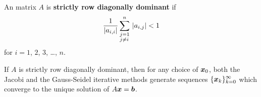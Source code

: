 \begin{defn}
An \nn matrix $A$ is
{\bfseries strictly row diagonally dominant} if
\[
\frac{1}{|a_{i,i}|}
\sum_{\begin{subarray}{l} j=1 \\j \neq i \end{subarray}}^n \,
|a_{i,j}| < 1
\]
for $i=1$, $2$, $3$, \ldots , $n$.
\end{defn}

\begin{theorem}
If $A$ is strictly row diagonally dominant, then for any choice of
$\bm{x}_{0}$, both the Jacobi and the Gauss-Seidel iterative methods
generate sequences $\displaystyle \{\bm{x}_k\}_{k=0}^\infty$ which
converge to the unique solution of $A \bm{x} = \bm{b}$.
\label{convcond}
\end{theorem}

